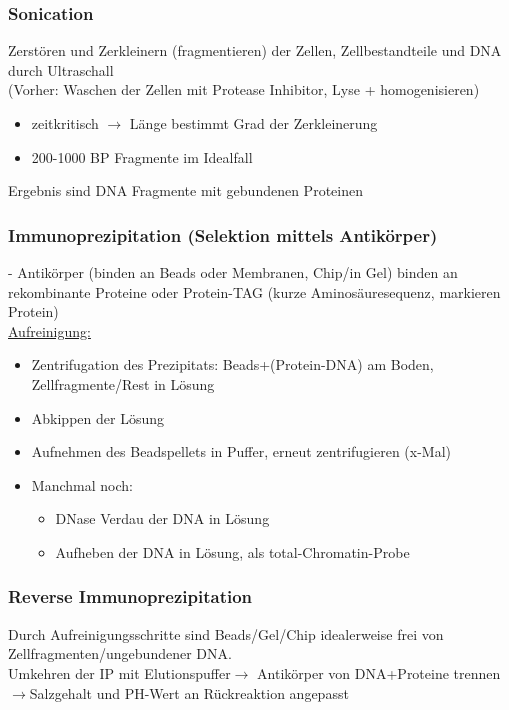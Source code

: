 \subsubsection{Sonication}
Zerstören und Zerkleinern (fragmentieren) der Zellen, Zellbestandteile und DNA durch Ultraschall\\
(Vorher: Waschen der Zellen mit Protease Inhibitor, Lyse + homogenisieren)
\begin{itemize}
	\item zeitkritisch $\rightarrow$ Länge bestimmt Grad der Zerkleinerung
	\item 200-1000 BP Fragmente im Idealfall
\end{itemize}
Ergebnis sind DNA Fragmente mit gebundenen Proteinen

\subsubsection{Immunoprezipitation (Selektion mittels Antikörper)}
- Antikörper (binden an Beads oder Membranen, Chip/in Gel) binden an rekombinante Proteine oder Protein-TAG (kurze Aminosäuresequenz, markieren Protein)\\
\underline{Aufreinigung:}
\begin{itemize}
	\item Zentrifugation des Prezipitats: Beads+(Protein-DNA) am Boden, Zellfragmente/Rest in Lösung
	\item Abkippen der Lösung
	\item Aufnehmen des Beadspellets in Puffer, erneut zentrifugieren (x-Mal)
	\item Manchmal noch:
	\begin{itemize}
		\item DNase Verdau der DNA in Lösung
		\item Aufheben der DNA in Lösung, als total-Chromatin-Probe
	\end{itemize}
\end{itemize}

\subsubsection{Reverse Immunoprezipitation}
Durch Aufreinigungsschritte sind Beads/Gel/Chip idealerweise frei von Zellfragmenten/ungebundener DNA.\\Umkehren der IP mit Elutionspuffer$\rightarrow$ Antikörper von DNA+Proteine trennen\\
$\rightarrow$Salzgehalt und PH-Wert an Rückreaktion angepasst

